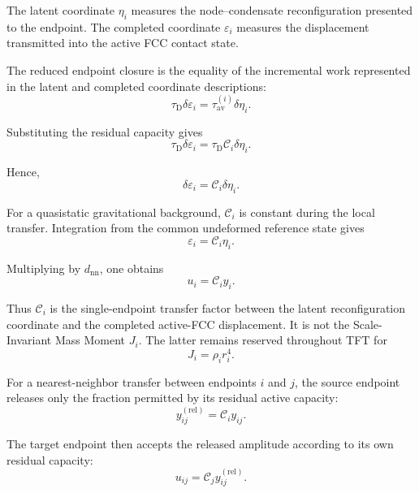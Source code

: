 The latent coordinate $\eta_i$ measures the node--condensate reconfiguration presented to the endpoint. The completed coordinate $\varepsilon_i$ measures the displacement transmitted into the active FCC contact state.

The reduced endpoint closure is the equality of the incremental work represented in the latent and completed coordinate descriptions:
\begin{equation}
    \tau_{\mathrm{D}} \delta\varepsilon_i = \tau_{\mathrm{av}}^{(i)} \delta\eta_i.
\end{equation}

Substituting the residual capacity gives
\begin{equation}
    \tau_{\mathrm{D}} \delta\varepsilon_i = \tau_{\mathrm{D}}\mathcal{C}_i \delta\eta_i.
\end{equation}

Hence,
\begin{equation}
    \delta\varepsilon_i = \mathcal{C}_i \delta\eta_i.
\end{equation}

For a quasistatic gravitational background, $\mathcal{C}_i$ is constant during the local transfer. Integration from the common undeformed reference state gives
\begin{equation}
    \varepsilon_i = \mathcal{C}_i\eta_i.
\end{equation}

Multiplying by $d_{\mathrm{nn}}$, one obtains
\begin{equation}
    u_i = \mathcal{C}_i y_i.
\end{equation}

Thus $\mathcal{C}_i$ is the single-endpoint transfer factor between the latent reconfiguration coordinate and the completed active-FCC displacement. It is not the Scale-Invariant Mass Moment $J_i$. The latter remains reserved throughout TFT for
\begin{equation}
    J_i = \rho_i r_i^4.
\end{equation}

For a nearest-neighbor transfer between endpoints $i$ and $j$, the source endpoint releases only the fraction permitted by its residual active capacity:
\begin{equation}
    y_{ij}^{(\mathrm{rel})} = \mathcal{C}_i y_{ij}.
\end{equation}

The target endpoint then accepts the released amplitude according to its own residual capacity:
\begin{equation}
    u_{ij} = \mathcal{C}_j y_{ij}^{(\mathrm{rel})}.
\end{equation}


